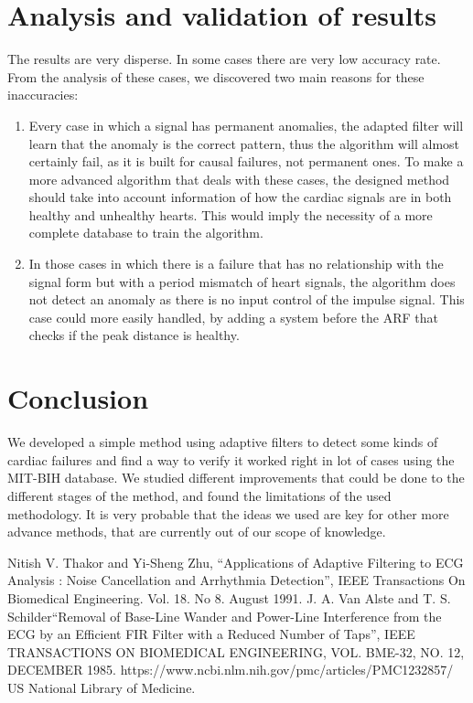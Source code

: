\documentclass[conference]{IEEEtran}
\begin{document}
\section{Analysis and validation of results}

The results are very disperse. In some cases there are very low accuracy rate. From the analysis of these cases, we discovered two main reasons for these inaccuracies: \par
\begin{enumerate}
\item Every case in which a signal has permanent anomalies, the adapted filter will learn that the anomaly is the correct pattern, thus the algorithm will almost certainly fail, as it is built for causal failures, not permanent ones. To make a more advanced algorithm that deals with these cases, the designed method should take into account information of how the cardiac signals are in both healthy and unhealthy hearts. This would imply the necessity of a more complete database to train the algorithm.
\item In those cases in which there is a failure that has no relationship with the signal form but with a period mismatch of heart signals, the algorithm does not detect an anomaly as there is no input control of the impulse signal. This case could more easily handled, by adding a system before the ARF that checks if the peak distance is healthy. 
\end{enumerate}

\section{Conclusion}
We developed a simple method using adaptive filters to detect some kinds of cardiac failures and find a way to verify it worked right in lot of cases using the MIT-BIH database. We studied different improvements that could be done to the different stages of the method, and found the limitations of the used methodology. It is very probable that the ideas we used are key for other more advance methods, that are currently out of our scope of knowledge.

\begin{thebibliography}{00}
 Nitish V. Thakor and Yi-Sheng Zhu, ``Applications of Adaptive Filtering to ECG Analysis :
Noise Cancellation and Arrhythmia Detection'', IEEE Transactions On Biomedical Engineering. Vol. 18. No 8. August 1991.
 J. A. Van Alste and T. S. Schilder``Removal of Base-Line Wander and Power-Line Interference from the ECG by an Efficient FIR Filter with a Reduced Number of Taps'', IEEE TRANSACTIONS ON BIOMEDICAL ENGINEERING, VOL. BME-32, NO. 12, DECEMBER 1985.
 https://www.ncbi.nlm.nih.gov/pmc/articles/PMC1232857/ US National Library of Medicine.
\end{thebibliography}
\end{document}
